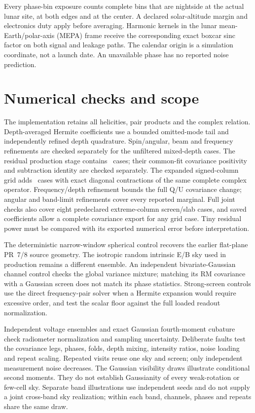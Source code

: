 \documentclass[10pt,letterpaper]{article}
\begin{document}
Every phase-bin exposure counts complete bins that are nightside at the
actual lunar site, at both edges and at the center. A declared solar-altitude
margin and electronics duty apply before averaging. Harmonic kernels in the lunar mean-Earth/polar-axis (MEPA) frame
receive the corresponding exact boxcar sinc factor on both signal and
leakage paths. The calendar origin is a simulation coordinate, not a launch
date. An unavailable phase has no reported noise prediction.



\section{Numerical checks and scope}

The implementation retains all helicities, pair products and the complex
relation. Depth-averaged Hermite coefficients use a bounded omitted-mode
tail and independently refined depth quadrature. Spin/angular, beam and
frequency refinements are checked separately for the unfiltered mixed-depth
cases. The residual production stage contains \ResidualCaseCount\ cases;
their common-fit covariance positivity and subtraction identity are checked
separately. The expanded signed-column grid adds \PhysicalCaseCount\ cases
with exact diagonal contractions of the same complete complex operator.
Frequency/depth refinement bounds the full Q/U covariance change; angular
and band-limit refinements cover every reported marginal. Full joint checks
also cover eight predeclared extreme-column screen/slab cases, and saved
coefficients allow a complete covariance export for any grid case. Tiny
residual power must be compared with its exported numerical error before
interpretation.

The deterministic narrow-window spherical control recovers the earlier
flat-plane PR~7/8 source geometry. The isotropic random intrinsic E/B sky
used in production remains a different ensemble. An independent
bivariate-Gaussian channel control checks the global variance mixture;
matching its RM covariance with a Gaussian screen does not match its phase
statistics. Strong-screen controls use the direct frequency-pair solver
when a Hermite expansion would require excessive order, and test the scalar
floor against the full loaded readout normalization.

Independent voltage ensembles and exact Gaussian fourth-moment cubature
check radiometer normalization and sampling uncertainty. Deliberate faults
test the covariance legs, phases, folds, depth mixing, intensity ratios,
noise loading and repeat scaling. Repeated visits reuse one sky and screen;
only independent measurement noise decreases. The Gaussian visibility
draws illustrate conditional second moments. They do not establish
Gaussianity of every weak-rotation or few-cell sky. Separate band
illustrations use independent seeds and do not supply a joint cross-band
sky realization; within each band, channels, phases and repeats share the
same draw.
\end{document}
